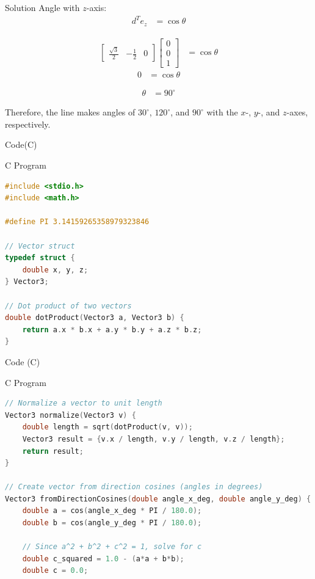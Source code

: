 \documentclass{beamer}
\begin{document}
\begin{frame}{Solution}
Angle with $z$-axis:
\begin{align}
d^T e_z &= \cos \theta 
\end{align}

\begin{align}
\begin{bmatrix} \tfrac{\sqrt{3}}{2} & -\tfrac{1}{2} & 0 \end{bmatrix}
\begin{bmatrix} 0 \\ 0 \\ 1 \end{bmatrix} &= \cos \theta 
\end{align}
\begin{align}
0 &= \cos \theta 
\end{align}

\begin{align}
\theta &= 90^\circ
\end{align}

Therefore, the line makes angles of $30^\circ$, $120^\circ$, and $90^\circ$ with the $x$-, $y$-, and $z$-axes, respectively.


\end{frame}

\begin{frame}[fragile]{Code(C)}
\begin{block}{C Program}
\begin{lstlisting}[language=C, basicstyle=\ttfamily\small, keywordstyle=\color{blue}, frame=single]
#include <stdio.h>
#include <math.h>

#define PI 3.14159265358979323846

// Vector struct
typedef struct {
    double x, y, z;
} Vector3;

// Dot product of two vectors
double dotProduct(Vector3 a, Vector3 b) {
    return a.x * b.x + a.y * b.y + a.z * b.z;
}
\end{lstlisting}
\end{block}
\end{frame}

\begin{frame}[fragile]{ Code (C)}
\begin{block}{C Program}
\begin{lstlisting}[language=C, basicstyle=\ttfamily\small, keywordstyle=\color{blue}, frame=single]
// Normalize a vector to unit length
Vector3 normalize(Vector3 v) {
    double length = sqrt(dotProduct(v, v));
    Vector3 result = {v.x / length, v.y / length, v.z / length};
    return result;
}

// Create vector from direction cosines (angles in degrees)
Vector3 fromDirectionCosines(double angle_x_deg, double angle_y_deg) {
    double a = cos(angle_x_deg * PI / 180.0);
    double b = cos(angle_y_deg * PI / 180.0);

    // Since a^2 + b^2 + c^2 = 1, solve for c
    double c_squared = 1.0 - (a*a + b*b);
    double c = 0.0;
\end{lstlisting}
\end{block}
\end{frame}
\end{document}
